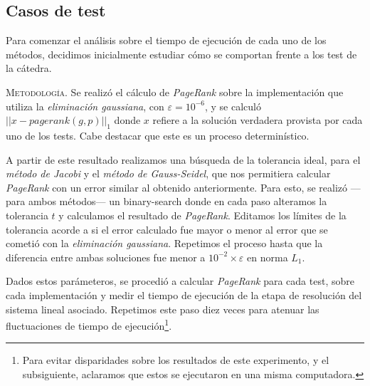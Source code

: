 \subsection{Casos de test}

Para comenzar el análisis sobre el tiempo de ejecución de cada uno de los métodos, decidimos inicialmente estudiar cómo se comportan frente a los test de la cátedra. %

\vspace{2em}
\noindent\textsc{Metodología}. Se realizó el cálculo de \textit{PageRank} sobre la implementación que utiliza la \textit{eliminación gaussiana}, con $\varepsilon = 10^{-6}$, y se calculó $||x - pagerank(g, p)||_1$ donde $x$ refiere a la solución verdadera provista por cada uno de los tests. Cabe destacar que este es un proceso determinístico. 

A partir de este resultado realizamos una búsqueda de la tolerancia ideal, para el \textit{método de Jacobi} y el \textit{método de Gauss-Seidel}, que nos permitiera calcular \textit{PageRank} con un error similar al obtenido anteriormente. Para esto, se realizó ---para ambos métodos--- un binary-search donde en cada paso alteramos la tolerancia $t$ y calculamos el resultado de \textit{PageRank}. Editamos los límites de la tolerancia acorde a si el error calculado fue mayor o menor al error que se cometió con la \textit{eliminación gaussiana}. Repetimos el proceso hasta que la diferencia entre ambas soluciones fue menor a $10^{-2} \times \varepsilon$ en norma $L_1$. %


Dados estos parámeteros, se procedió a calcular \textit{PageRank} para cada test, sobre cada implementación y medir el tiempo de ejecución de la etapa de resolución del sistema lineal asociado. Repetimos este paso diez veces para atenuar las fluctuaciones de tiempo de ejecución\footnote{Para evitar disparidades sobre los resultados de este experimento, y el subsiguiente, aclaramos que estos se ejecutaron en una misma computadora.}. 

